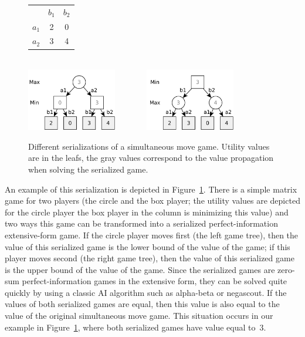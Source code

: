 \begin{figure}
\centering
\begin{tabular}{l|c|c|}
 \multicolumn{1}{c}{~} & \multicolumn{1}{c}{$b_1$}  &  \multicolumn{1}{c}{$b_2$}\\\cline{2-3}
$a_1$ &  2  &  0\\\cline{2-3}
$a_2$ &  3  &  4\\\cline{2-3}
\end{tabular}
\\\vspace{0.5cm}
\includegraphics[width=0.35\textwidth]{figures/serialization1.pdf}~~~~~~~
\includegraphics[width=0.35\textwidth]{figures/serialization2.pdf}
\caption{Different serializations of a simultaneous move game. Utility values are in the leafs, the gray values correspond to the value propagation when solving the serialized game.}\label{fig:serialization}
\end{figure}

An example of this serialization is depicted in Figure~\ref{fig:serialization}.
There is a simple matrix game for two players (the circle and the box player; the utility values are depicted for the circle player \ie the box player in the column is minimizing this value) and two ways this game can be transformed into a serialized perfect-information extensive-form game.
If the circle player moves first (the left game tree), then the value of this serialized game is the lower bound of the value of the game; if this player moves second (the right game tree), then the value of this serialized game is the upper bound of the value of the game.
Since the serialized games are zero-sum perfect-information games in the extensive form, they can be solved quite quickly by using a classic AI
algorithm such as alpha-beta or negascout.
If the values of both serialized games are equal, then this value is also equal to the value of the original simultaneous move game.
This situation occurs in our example in Figure~\ref{fig:serialization}, where both serialized games have value equal to~$3$.


